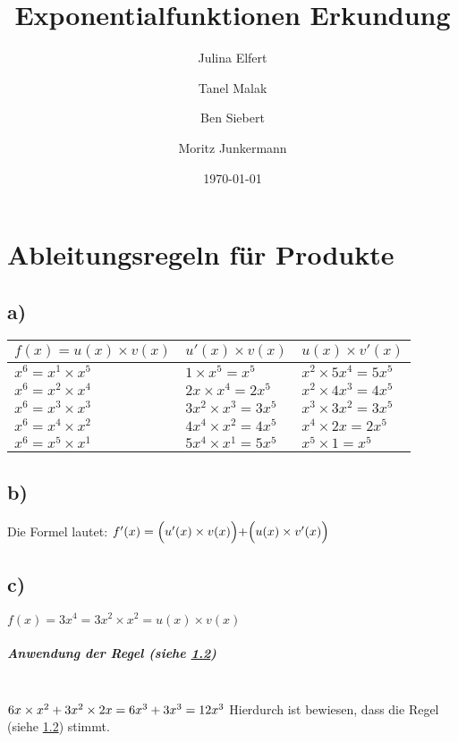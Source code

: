 \documentclass[12pt, a4paper]{report}
\begin{document}
	\bsremovechaptertitle
	\title{Exponentialfunktionen Erkundung}
	\author{Julina Elfert \and Tanel Malak \and Ben Siebert \and Moritz Junkermann}
	\date{\today}
	\maketitle
	\tableofcontents
	\chapter{Ableitungsregeln für Produkte}
	\section{a)}
	\begin{tabularx}{\textwidth}{|X|X|X|}
	 \hline
	 $f(x) = u(x) \times v(x)$ & $u'(x) \times v(x)$ & $u(x) \times v'(x)$ \\
	 \hline
	 $x^6 = x^1 \times x ^5$ & $1 \times x^5 = x^5$ & $x^2 \times 5x^4 = 5x^5$ \\
	 \hline
	 $x^6 = x^2 \times x^4$ & $2x \times x^4 = 2x^5$ & $x^2 \times 4x^3 = 4x^5$ \\
	 \hline
	 $x^6 = x^3 \times x^3$ & $3x^2 \times x^3 = 3x^5$ & $x^3 \times 3x^2 = 3x^5$ \\
	 \hline
	 $x^6 = x^4 \times x^2$ & $4x^4 \times x^2 = 4x^5$ & $x^4 \times 2x = 2x^5$ \\
	 \hline
	 $x^6 = x^5 \times x^1$ & $5x^4 \times x^1 = 5x^5$ & $x^5 \times 1 = x^5$ \\
	 \hline
	\end{tabularx}
	\section{b)}\label{sec:b_rule}
	Die Formel lautet: $f'(x) = \Bigl(u'(x) \times v(x)\Bigl) + \Bigl(u(x) \times v'(x)\Bigl)$
	\section{c)}
	$f(x) = 3x^4 = 3x^2 \times x^2 = u(x) \times v(x)$ \\
	\paragraph{Anwendung der Regel (siehe \ref{sec:b_rule})} \mbox{} \\
	$
	6x \times x^2 + 3x^2 \times 2x \\
	= 6x^3 + 3x^3 \\
	= 12x^3 \\
	$
	Hierdurch ist bewiesen, dass die Regel (siehe \ref{sec:b_rule}) stimmt.
	
\end{document}
